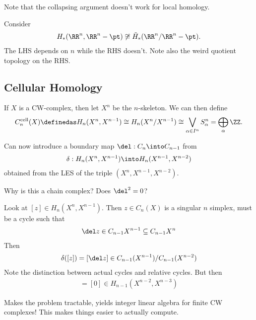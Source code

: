 Note that the collapsing argument doesn't work for local homology.

\begin{example}

Consider
\begin{align*}
H_*(\RR^n, \RR^n - \pt) \not\cong \tilde H_*(\RR^n/\RR^n - \pt)
.\end{align*} The LHS depends on \(n\) while the RHS doesn't. Note also
the weird quotient topology on the RHS.

\end{example}

\hypertarget{cellular-homology}{%
\subsection{Cellular Homology}\label{cellular-homology}}

If \(X\) is a CW-complex, then let \(X^n\) be the \(n\)-skeleton. We can
then define
\begin{align*}
C_n^{\text{cell}}(X) \definedas H_n(X^n, X^{n-1}) \cong H_n(X^n/X^{n-1}) \cong \bigvee_{\alpha \in I^n} S_\alpha^n = \bigoplus_\alpha \ZZ
.\end{align*}

Can now introduce a boundary map \(\del:C_n \into C_{n-1}\) from
\begin{align*}
\delta: H_n(X^n, X^{n-1}) \into H_n(X^{n-1}, X^{n-2})
\end{align*} obtained from the LES of the triple
\((X^n, X^{n-1}, X^{n-2})\).

Why is this a chain complex? Does \(\del^2 = 0\)?

Look at \([z] \in H_n(X^n, X^{n-1})\). Then \(z\in C_n(X)\) is a
singular \(n\) simplex, must be a cycle such that
\begin{align*}
\del z \in C_{n-1}X^{n-1} \subseteq C_{n-1}X^n
\end{align*} Then
\begin{align*}
\delta([z]) = [\del z] \in C_{n-1}(X^{n-1}) / C_{n-1}(X^{n-2})
\end{align*} Note the distinction between actual cycles and relative
cycles. But then
\begin{align*}
[\del \del z] = [0] \in H_{n-1}(X^{n-2}, X^{n-3})
\end{align*}

Makes the problem tractable, yields integer linear algebra for finite CW
complexes! This makes things easier to actually compute.

\newpage

